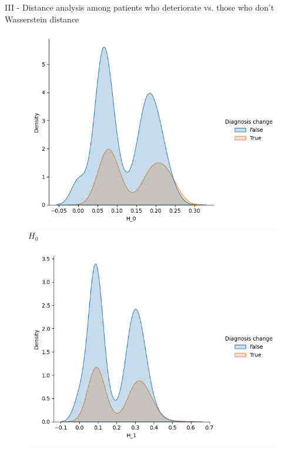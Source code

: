 \documentclass[aspectratio=169, 10pt, dvipsnames]{beamer}
\begin{document}
\begin{frame}[fragile]{III - Distance analysis among patients who deteriorate vs. those who don't}
Wasserstein distance\\
  \begin{figure}
    \centering
    \includegraphics[width=\textwidth]{figures/temporal_evolution/wasserstein_H_0_dist_diag_change.png}
    \caption{$H_0$}
  \end{figure}
  \endminipage
  \hfill
  \begin{figure}
    \centering
    \includegraphics[width=\textwidth]{figures/temporal_evolution/wasserstein_H_1_dist_diag_change.png}

\end{figure}
\end{frame}
\end{document}
